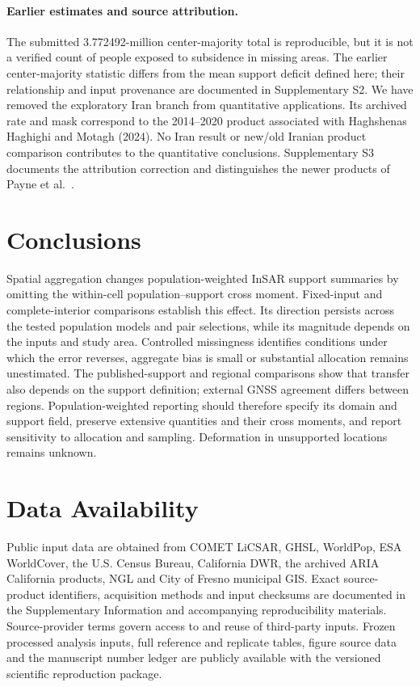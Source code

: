 \documentclass[pdflatex,sn-nature]{sn-jnl}
\begin{document}
\paragraph{Earlier estimates and source attribution.} The submitted 3.772492-million center-majority total is reproducible, but it is not a verified count of people exposed to subsidence in missing areas. The earlier center-majority statistic differs from the mean support deficit defined here; their relationship and input provenance are documented in Supplementary S2. We have removed the exploratory Iran branch from quantitative applications. Its archived rate and mask correspond to the 2014--2020 product associated with Haghshenas Haghighi and Motagh (2024). No Iran result or new/old Iranian product comparison contributes to the quantitative conclusions. Supplementary S3 documents the attribution correction and distinguishes the newer products of Payne et al.\ \citep{haghshenas2024iran,payne2025iran,payne2024data}.

\section{Conclusions}
Spatial aggregation changes population-weighted InSAR support summaries by omitting the within-cell population--support cross moment. Fixed-input and complete-interior comparisons establish this effect. Its direction persists across the tested population models and pair selections, while its magnitude depends on the inputs and study area. Controlled missingness identifies conditions under which the error reverses, aggregate bias is small or substantial allocation remains unestimated. The published-support and regional comparisons show that transfer also depends on the support definition; external GNSS agreement differs between regions. Population-weighted reporting should therefore specify its domain and support field, preserve extensive quantities and their cross moments, and report sensitivity to allocation and sampling. Deformation in unsupported locations remains unknown.

\section*{Data Availability}
Public input data are obtained from COMET LiCSAR, GHSL, WorldPop, ESA WorldCover, the U.S. Census Bureau, California DWR, the archived ARIA California products, NGL and City of Fresno municipal GIS. Exact source-product identifiers, acquisition methods and input checksums are documented in the Supplementary Information and accompanying reproducibility materials. Source-provider terms govern access to and reuse of third-party inputs. Frozen processed analysis inputs, full reference and replicate tables, figure source data and the manuscript number ledger are publicly available with the versioned scientific reproduction package.
\end{document}
